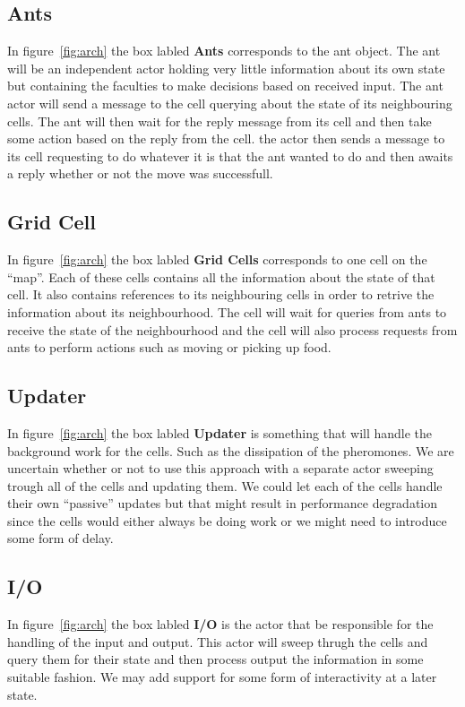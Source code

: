 \documentclass[a4paper]{article}
\begin{document}
\subsection{Ants}
In figure~\ref{fig:arch} the box labled \textbf{Ants} corresponds to the ant
object.
The ant will be an independent actor holding very little information about its
own state but containing the faculties to make decisions based on received
input. The ant actor will send a message to the cell querying about the state
of its neighbouring cells. The ant will then wait for the reply message from its
cell and then take some action based on the reply from the cell. the actor then
sends a message to its cell requesting to do whatever it is that the ant wanted
to do and then awaits a reply whether or not the move was successfull.

\subsection{Grid Cell}
In figure~\ref{fig:arch} the box labled \textbf{Grid Cells} corresponds to one
cell on the ``map''. Each of these cells contains all the information about the state of
that cell. It also contains references to its neighbouring cells in order to
retrive the information about its neighbourhood. The cell will wait for queries
from ants to receive the state of the neighbourhood and the cell will also
process requests from ants to perform actions such as moving or picking up food.

\subsection{Updater}
In figure~\ref{fig:arch} the box labled \textbf{Updater} is something that will
handle the background work for the cells. Such as the dissipation of the pheromones.
We are uncertain whether or not to use this approach with a separate actor sweeping
trough all of the cells and updating them. We could let each of the cells handle
their own ``passive'' updates but that might result in performance degradation
since the cells would either always be doing work or we might need to introduce
some form of delay.

\subsection{I/O}
In figure~\ref{fig:arch} the box labled \textbf{I/O} is the actor that be
responsible for the handling of the input and output. This actor will sweep thrugh the cells and
query them for their state and then process output the information in some
suitable fashion. We may add support for some form of interactivity at a later
state.
\end{document}
